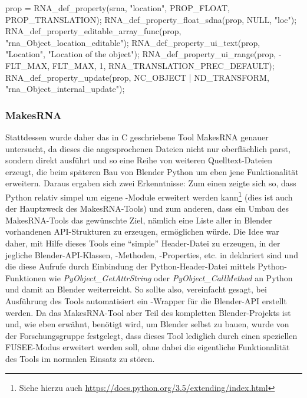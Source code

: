 \begin{code}[caption={Deklaration der Property \protect\emph{location} der Klasse \protect\emph{Object} in \protect\emph{rna\_object.c}},label={lst:locdecl}]
	prop = RNA_def_property(srna, "location", PROP_FLOAT, PROP_TRANSLATION);
	RNA_def_property_float_sdna(prop, NULL, "loc");
	RNA_def_property_editable_array_func(prop, "rna_Object_location_editable");
	RNA_def_property_ui_text(prop, "Location", "Location of the object");
	RNA_def_property_ui_range(prop, -FLT_MAX, FLT_MAX, 1, RNA_TRANSLATION_PREC_DEFAULT);
	RNA_def_property_update(prop, NC_OBJECT | ND_TRANSFORM, "rna_Object_internal_update");
\end{code}

\subsubsection{MakesRNA}

Stattdessen wurde daher das in C geschriebene Tool MakesRNA genauer untersucht, da dieses die angesprochenen Dateien nicht nur oberflächlich parst, sondern direkt ausführt und so eine Reihe von weiteren Quelltext-Dateien erzeugt, die beim späteren Bau von Blender Python um eben jene Funktionalität erweitern. Daraus ergaben sich zwei Erkenntnisse: Zum einen zeigte sich so, dass Python relativ simpel um eigene \CC-Module erweitert werden kann\footnote{Siehe hierzu auch \url{https://docs.python.org/3.5/extending/index.html}} (dies ist auch der Hauptzweck des MakesRNA-Tools) und zum anderen, dass ein Umbau des MakesRNA-Tools das gewünschte Ziel, nämlich eine Liste aller in Blender vorhandenen API-Strukturen zu erzeugen, ermöglichen würde. Die Idee war daher, mit Hilfe dieses Tools eine \enquote{simple} Header-Datei zu erzeugen, in der jegliche Blender-API-Klassen, -Methoden, -Properties, etc. in \CC{} deklariert sind und die diese Aufrufe durch Einbindung der Python-Header-Datei mittels Python-Funktionen wie \emph{PyObject\_GetAttrString} oder \emph{PyObject\_CallMethod} an Python und damit an Blender weiterreicht. So sollte also, vereinfacht gesagt, bei Ausführung des Tools automatisiert ein \CC{}-Wrapper für die Blender-API erstellt werden. Da das MakesRNA-Tool aber Teil des kompletten Blender-Projekts ist und, wie eben erwähnt, benötigt wird, um Blender selbst zu bauen, wurde von der Forschungsgruppe festgelegt, dass dieses Tool lediglich durch einen speziellen FUSEE-Modus erweitert werden soll, ohne dabei die eigentliche Funktionalität des Tools im normalen Einsatz zu stören. 

